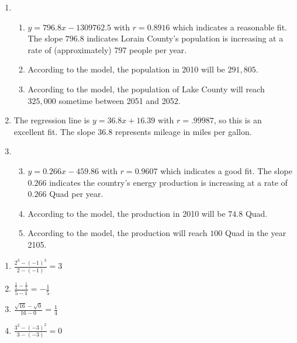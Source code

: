 \begin{enumerate}
\item  \begin{enumerate}
 

\item  $y = 796.8x - 1309762.5$ with $r=0.8916$ which indicates a reasonable fit.  The slope $796.8$ indicates Lorain County's population is increasing at a rate of (approximately) 797 people per year. 

\item  According to the model, the population in 2010 will be $291, \! 805$.

\item  According to the model, the population of Lake County will reach $325,\!000$ sometime between 2051 and 2052.

\end{enumerate}

\item The regression line is $y = 36.8x + 16.39$ with  $r = .99987$, so this is an excellent fit.  The slope $36.8$ represents mileage in miles per gallon.

\item \begin{enumerate}

\setcounter{enumii}{2}

\item $y = 0.266x - 459.86$ with $r = 0.9607$ which indicates a good fit.  The slope $0.266$ indicates the country's energy production is increasing at a rate of $0.266$ Quad per year.

\item According to the model, the production in 2010 will be $74.8$ Quad.

\item According to the model, the production will reach $100$ Quad in the year 2105.

\end{enumerate}



\setcounter{HW}{\value{enumi}}
\end{enumerate}

\vspace{-0.1in}

\begin{multicols}{4}
\begin{enumerate}
\setcounter{enumi}{\value{HW}}

\item $\frac{2^{3} - (-1)^{3}}{2 - (-1)} = 3$
\item $\frac{\frac{1}{5} - \frac{1}{1}}{5 - 1} = -\frac{1}{5}$




\item $\frac{\sqrt{16} - \sqrt{0}}{16 - 0} = \frac{1}{4}$
\item $\frac{3^{2} - (-3)^{2}}{3 - (-3)} = 0$

\setcounter{HW}{\value{enumi}}
\end{enumerate}
\end{multicols}

